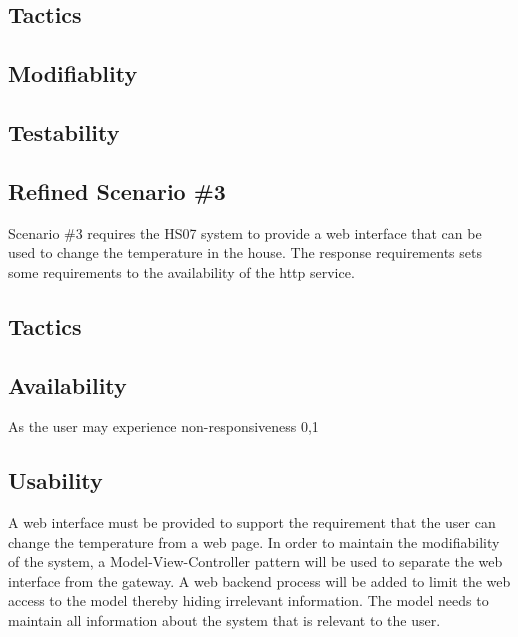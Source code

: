 \documentclass[a4paper,10pt]{article}
\begin{document}
\subsection{Tactics}
\subsection{Modifiablity}
\subsection{Testability}
\subsection{Refined Scenario \#3}
Scenario \#3 requires the HS07 system to provide a web interface that can be used to change the temperature in the house. The response requirements sets some requirements to the availability of the http service.
\subsection{Tactics}
\subsection{Availability}
As the user may experience non-responsiveness 0,1%

\subsection{Usability}
A web interface must be provided to support the requirement that the user can change the temperature from a web page. In order to maintain the modifiability of the system, a Model-View-Controller pattern will be used to separate the web interface from the gateway. A web backend process will be added to limit the web access to the model thereby hiding irrelevant information. The model needs to maintain all information about the system that is relevant to the user.




\end{document}

